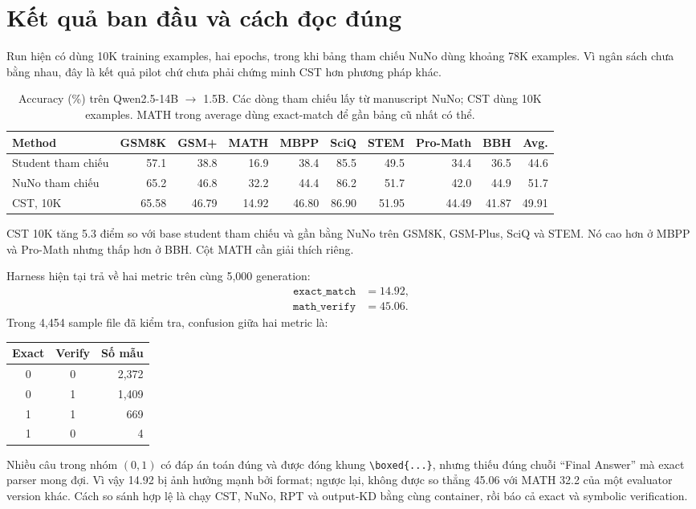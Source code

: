 \documentclass{article}
\begin{document}
\section{Kết quả ban đầu và cách đọc đúng}

Run hiện có dùng 10K training examples, hai epochs, trong khi bảng tham chiếu
NuNo dùng khoảng 78K examples.  Vì ngân sách chưa bằng nhau, đây là kết quả
pilot chứ chưa phải chứng minh CST hơn phương pháp khác.

\begin{table}[t]
\caption{Accuracy (\%) trên Qwen2.5-14B $\rightarrow$ 1.5B. Các dòng tham
chiếu lấy từ manuscript NuNo; CST dùng 10K examples. MATH trong average dùng
exact-match để gần bảng cũ nhất có thể.}
\label{tab:results}
\centering
\small
\setlength{\tabcolsep}{3pt}
\begin{tabular}{lrrrrrrrrr}
\toprule
Method & GSM8K & GSM+ & MATH & MBPP & SciQ & STEM & Pro-Math & BBH & Avg.\\
\midrule
Student tham chiếu & 57.1 & 38.8 & 16.9 & 38.4 & 85.5 & 49.5 & 34.4 & 36.5 & 44.6\\
NuNo tham chiếu & 65.2 & 46.8 & 32.2 & 44.4 & 86.2 & 51.7 & 42.0 & 44.9 & 51.7\\
\midrule
CST, 10K & 65.58 & 46.79 & 14.92 & 46.80 & 86.90 & 51.95 & 44.49 & 41.87 & 49.91\\
\bottomrule
\end{tabular}
\end{table}

CST 10K tăng 5.3 điểm so với base student tham chiếu và gần bằng NuNo trên
GSM8K, GSM-Plus, SciQ và STEM.  Nó cao hơn ở MBPP và Pro-Math nhưng thấp hơn ở
BBH.  Cột MATH cần giải thích riêng.

Harness hiện tại trả về hai metric trên cùng 5,000 generation:
\begin{align}
 \texttt{exact\_match}&=14.92,\\
 \texttt{math\_verify}&=45.06.
\end{align}
Trong 4,454 sample file đã kiểm tra, confusion giữa hai metric là:
\begin{center}
\begin{tabular}{ccr}
\toprule
Exact & Verify & Số mẫu\\
\midrule
0 & 0 & 2,372\\
0 & 1 & 1,409\\
1 & 1 & 669\\
1 & 0 & 4\\
\bottomrule
\end{tabular}
\end{center}
Nhiều câu trong nhóm $(0,1)$ có đáp án toán đúng và được đóng khung
\texttt{\textbackslash boxed\{...\}}, nhưng thiếu đúng chuỗi ``Final Answer''
mà exact parser mong đợi.  Vì vậy 14.92 bị ảnh hưởng mạnh bởi format; ngược lại,
không được so thẳng 45.06 với MATH 32.2 của một evaluator version khác.  Cách
so sánh hợp lệ là chạy CST, NuNo, RPT và output-KD bằng cùng container, rồi báo
cả exact và symbolic verification.
\end{document}
